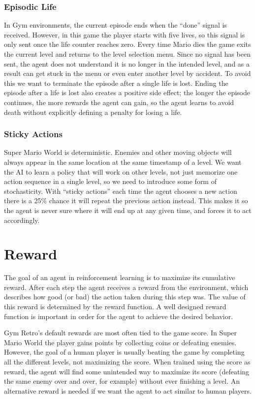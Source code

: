 \documentclass[a4paper]{article}
\begin{document}
\subsubsection{Episodic Life}
In Gym environments, the current episode ends when the ``done'' signal is received.
However, in this game the player starts with five lives, so this signal is only sent once the life counter reaches zero.
Every time Mario dies the game exits the current level and returns to the level selection menu.
Since no signal has been sent, the agent does not understand it is no longer in the intended level, and as a result can get stuck in the menu or even enter another level by accident.
To avoid this we want to terminate the episode after a single life is lost.
Ending the episode after a life is lost also creates a positive side effect; the longer the episode continues, the more rewards the agent can gain, so the agent learns to avoid death without explicitly defining a penalty for losing a life.

\subsubsection{Sticky Actions}
Super Mario World is deterministic. 
Enemies and other moving objects will always appear in the same location at the same timestamp of a level.
We want the AI to learn a policy that will work on other levels, not just memorize one action sequence in a single level, so we need to introduce some form of stochasticity.
With ``sticky actions'' \cite{machado2018revisiting} each time the agent chooses a new action there is a 25\% chance it will repeat the previous action instead.
This makes it so the agent is never sure where it will end up at any given time, and forces it to act accordingly.

\section{Reward} \label{s:reward}
The goal of an agent in reinforcement learning is to maximize its cumulative reward.
After each step the agent receives a reward from the environment, which describes how good (or bad) the action taken during this step was.
The value of this reward is determined by the reward function.
A well designed reward function is important in order for the agent to achieve the desired behavior.

Gym Retro's default rewards are most often tied to the game score.
In Super Mario World the player gains points by collecting coins or defeating enemies.
However, the goal of a human player is usually beating the game by completing all the different levels, not maximizing the score.
When trained using the score as reward, the agent will find some unintended way to maximize its score (defeating the same enemy over and over, for example) without ever finishing a level.
An alternative reward is needed if we want the agent to act similar to human players.
\end{document}
